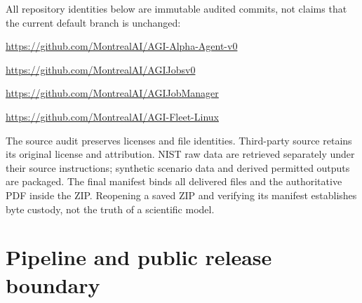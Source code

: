\documentclass[11pt,letterpaper]{article}
\begin{document}
All repository identities below are immutable audited commits, not claims that the current default branch is unchanged:

\begin{description}[style=nextline,leftmargin=0pt,labelwidth=0pt,labelsep=0pt,font=\normalfont\bfseries]
\item[AGI-Alpha-Agent-v0]
\url{https://github.com/MontrealAI/AGI-Alpha-Agent-v0}\\
\item[AGIJobsv0]
\url{https://github.com/MontrealAI/AGIJobsv0}\\
\item[AGIJobManager]
\url{https://github.com/MontrealAI/AGIJobManager}\\
\item[AGI-Fleet-Linux]
\url{https://github.com/MontrealAI/AGI-Fleet-Linux}\\
\end{description}

The source audit preserves licenses and file identities. Third-party source retains its original license and attribution. NIST raw data are retrieved separately under their source instructions; synthetic scenario data and derived permitted outputs are packaged. The final manifest binds all delivered files and the authoritative PDF inside the ZIP. Reopening a saved ZIP and verifying its manifest establishes byte custody, not the truth of a scientific model.

\section{Pipeline and public release boundary}
\end{document}
